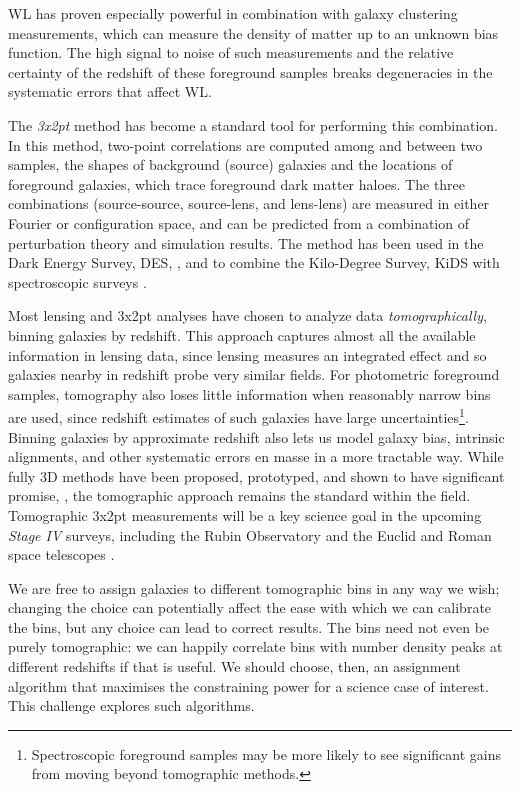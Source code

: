 \documentclass[twocolumn,twocolappendix]{aastex63}
\begin{document}
WL has proven especially powerful in combination with galaxy clustering measurements,
which can measure the density of matter up to an unknown bias function.  The high signal
to noise of such measurements and the relative certainty of the redshift of these foreground
samples breaks degeneracies in the systematic errors that affect WL.

The \emph{3x2pt} method has become a standard tool for performing this combination.
In this method, two-point correlations are computed among and between two samples, the shapes of 
background (source) galaxies and the locations of foreground galaxies, which trace foreground
dark matter haloes.  The three combinations (source-source, source-lens, and lens-lens) are
measured in either Fourier or configuration space, and can be predicted from a combination of 
perturbation theory and simulation results.  The method has been used in the Dark Energy Survey, DES, 
\citep{des-3x2pt}, and to combine the Kilo-Degree 
Survey, KiDS with spectroscopic surveys \citep{kids-3x2pt, kids_gama, kids_2df}.

Most lensing and 3x2pt analyses have chosen to analyze data \emph{tomographically}, 
binning galaxies by redshift.
This approach captures almost all the available information in lensing data, since lensing measures
an integrated effect and so galaxies nearby in redshift probe very similar fields.  For photometric
foreground samples, tomography also loses little information when reasonably narrow bins are used,
since redshift estimates of such galaxies have
large uncertainties\footnote{Spectroscopic foreground samples may be more likely to see significant 
gains from moving beyond tomographic methods.}.  Binning galaxies by approximate redshift also lets us 
model galaxy bias, intrinsic alignments, and other systematic errors en masse in a more tractable way.
While fully 3D methods have been proposed, prototyped, and shown to have significant promise, 
\citep{heavens,kitching}, the tomographic approach remains the standard within the field.
Tomographic 3x2pt measurements will be a key science goal in the upcoming \emph{Stage IV} surveys,
including the Rubin Observatory \citep{rubin} and the Euclid and Roman space telescopes
\citep{euclid,roman}.

We are free to assign galaxies to different tomographic bins in any way we wish; changing the choice
can potentially affect the ease with which we can calibrate
the bins, but any choice can lead to correct results. The bins need not even be purely tomographic: we can happily correlate bins with number density peaks at different redshifts if that is useful.
We should choose, then, an assignment algorithm that maximises the constraining power for a science
case of interest.  This challenge explores such algorithms.
\end{document}
